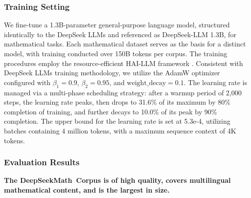 \begin{itemize}[topsep=0pt]
\subsubsection{Training Setting}
\label{sec:quality-policy}
We fine-tune a 1.3B-parameter general-purpose language model, structured identically to the DeepSeek LLMs \citep{deepseek-llm} and referenced as DeepSeek-LLM 1.3B, for mathematical tasks. Each mathematical dataset serves as the basis for a distinct model, with training conducted over 150B tokens per corpus. The training procedures employ the resource-efficient HAI-LLM framework \citep{haillm}. Consistent with DeepSeek LLMs training methodology, we utilize the AdamW optimizer \citep{adamW} configured with $\beta_1=0.9$, $\beta_2=0.95$, and $\mathrm{weight\_decay}=0.1$. The learning rate is managed via a multi-phase scheduling strategy: after a warmup period of 2,000 steps, the learning rate peaks, then drops to 31.6\% of its maximum by 80\% completion of training, and further decays to 10.0\% of its peak by 90\% completion. The upper bound for the learning rate is set at 5.3e-4, utilizing batches containing 4 million tokens, with a maximum sequence context of 4K tokens.

\subsubsection{Evaluation Results}

\textbf{The DeepSeekMath~Corpus is of high quality, covers multilingual mathematical content, and is the largest in size.}


\end{itemize}
